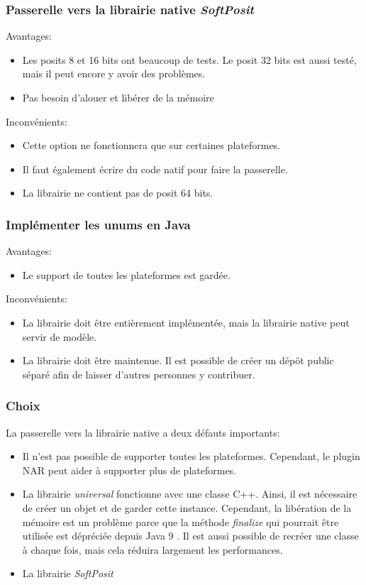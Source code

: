 \subsubsection{Passerelle vers la librairie native \textit{SoftPosit}}

Avantages:
\begin{itemize}
    \item Les posits 8 et 16 bits ont beaucoup de tests. Le posit 32 bits est aussi testé, mais il peut encore y avoir des problèmes.
    \item Pas besoin d'alouer et libérer de la mémoire
\end{itemize}

Inconvénients:
\begin{itemize}
    \item Cette option ne fonctionnera que sur certaines plateformes.
    \item Il faut également écrire du code natif pour faire la passerelle.
    \item La librairie ne contient pas de posit 64 bits.
\end{itemize}

\subsubsection{Implémenter les unums en Java}

Avantages:
\begin{itemize}
    \item Le support de toutes les plateformes est gardée.
\end{itemize}

Inconvénients:
\begin{itemize}
    \item La librairie doit être entièrement implémentée, mais la librairie native peut servir de modèle.
    \item La librairie doit être maintenue. Il est possible de créer un dépôt public séparé afin de laisser d'autres personnes y contribuer.
\end{itemize}

\subsubsection{Choix}

La passerelle vers la librairie native a deux défauts importants:
\begin{itemize}
    \item Il n'est pas possible de supporter toutes les plateformes. Cependant, le plugin NAR \cite{nar-maven-plugin} peut aider à supporter plus de plateformes.
    \item La librairie \textit{universal} fonctionne avec une classe C++. Ainsi, il est nécessaire de créer un objet et de garder cette instance. Cependant, la libération de la mémoire est un problème parce que la méthode \textit{finalize} qui pourrait être utilisée est dépréciée depuis Java 9 \cite{java-finalize-documentation}. Il est aussi possible de recréer une classe à chaque fois, mais cela réduira largement les performances.
    \item La librairie \textit{SoftPosit}
\end{itemize}

